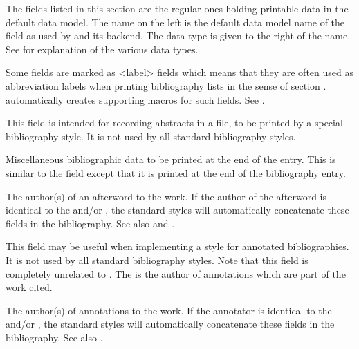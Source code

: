 \documentclass{ltxdockit}[2011/03/25]
\newcommand*{\biblatex}{\sty{biblatex}\xspace}
\begin{document}
The fields listed in this section are the regular ones holding printable data in the default data model. The name on the left is the default data model name of the field as used by \biblatex and its backend. The \biblatex data type is given to the right of the name. See  for explanation of the various data types.

Some fields are marked as <label> fields which means that they are often used as abbreviation labels when printing bibliography lists in the sense of section . \biblatex automatically creates supporting macros for such fields. See .

\begin{fieldlist}


This field is intended for recording abstracts in a  file, to be printed by a special bibliography style. It is not used by all standard bibliography styles.


Miscellaneous bibliographic data to be printed at the end of the entry. This is similar to the  field except that it is printed at the end of the bibliography entry.


The author(s) of an afterword to the work. If the author of the afterword is identical to the  and\slash or , the standard styles will automatically concatenate these fields in the bibliography. See also  and .


This field may be useful when implementing a style for annotated bibliographies. It is not used by all standard bibliography styles. Note that this field is completely unrelated to . The  is the author of annotations which are part of the work cited.


The author(s) of annotations to the work. If the annotator is identical to the  and\slash or , the standard styles will automatically concatenate these fields in the bibliography. See also .



\end{fieldlist}
\end{document}
